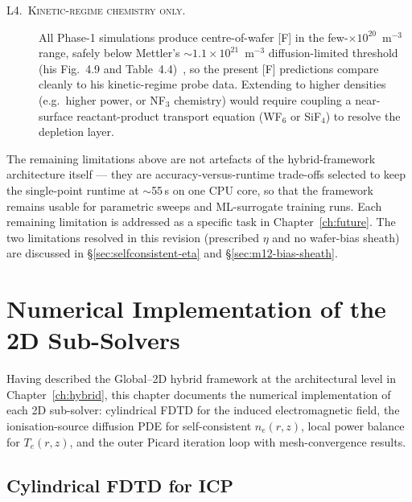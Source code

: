 \documentclass[11pt,a4paper]{report}
\begin{document}
\begin{description}
  \item[\textsc{L4.\ Kinetic-regime chemistry only.}]  All Phase-1 simulations produce centre-of-wafer [F] in the few-$\times 10^{20}$~m$^{-3}$ range, safely below Mettler's $\sim 1.1 \times 10^{21}$~m$^{-3}$ diffusion-limited threshold (his Fig.~4.9 and Table~4.4)~\cite{Mettler2025}, so the present [F] predictions compare cleanly to his kinetic-regime probe data.  Extending to higher densities (e.g.\ higher power, or NF$_3$ chemistry) would require coupling a near-surface reactant-product transport equation (WF$_6$ or SiF$_4$) to resolve the depletion layer.

\end{description}

The remaining limitations above are not artefacts of the hybrid-framework architecture itself --- they are accuracy-versus-runtime trade-offs selected to keep the single-point runtime at $\sim$55\,s on one CPU core, so that the framework remains usable for parametric sweeps and ML-surrogate training runs.  Each remaining limitation is addressed as a specific task in Chapter~\ref{ch:future}.  The two limitations resolved in this revision (prescribed $\eta$ and no wafer-bias sheath) are discussed in \S\ref{sec:selfconsistent-eta} and \S\ref{sec:m12-bias-sheath}.


\newpage
\chapter{Numerical Implementation of the 2D Sub-Solvers}
\label{part:phase1}

Having described the Global--2D hybrid framework at the architectural level in Chapter~\ref{ch:hybrid}, this chapter documents the numerical implementation of each 2D sub-solver: cylindrical FDTD for the induced electromagnetic field, the ionisation-source diffusion PDE for self-consistent $n_e(r,z)$, local power balance for $T_e(r,z)$, and the outer Picard iteration loop with mesh-convergence results.


\section{Cylindrical FDTD for ICP}
\label{sec:m06c}
\end{document}
